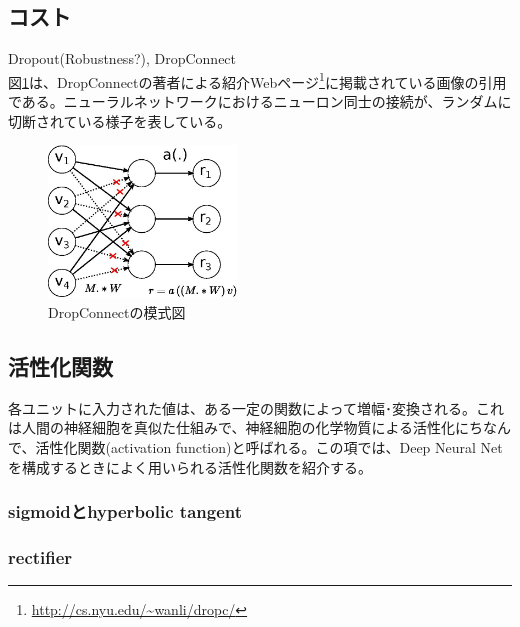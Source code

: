 \subsection{コスト}
Dropout(Robustness?), DropConnect \\
図\ref{c3_dropconnect}は、DropConnectの著者による紹介Webページ\footnote{\url{http://cs.nyu.edu/~wanli/dropc/}}に掲載されている画像の引用である。ニューラルネットワークにおけるニューロン同士の接続が、ランダムに切断されている様子を表している。
\begin{figure}[tbp]
 \begin{center}
  \includegraphics[width=50mm]{img/c3/nn_dc}
 \end{center}
 \caption{DropConnectの模式図}
 \label{c3_dropconnect}
\end{figure}
\subsection{活性化関数}
各ユニットに入力された値は、ある一定の関数によって増幅･変換される。これは人間の神経細胞を真似た仕組みで、神経細胞の化学物質による活性化にちなんで、活性化関数(activation function)と呼ばれる。この項では、Deep Neural Netを構成するときによく用いられる活性化関数を紹介する。
\subsubsection{sigmoidとhyperbolic tangent}
\subsubsection{rectifier}
